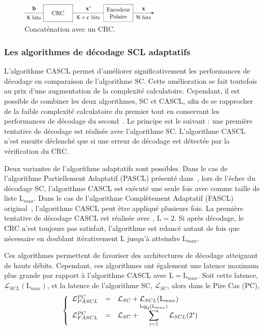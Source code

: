 \begin{figure}[t]
\centering
\includegraphics[width=0.6\textwidth]{main/ch1_fig/crc}
\caption{Concaténation avec un CRC.}
\label{fig:crc}
\end{figure}
\subsubsection{Les algorithmes de décodage SCL adaptatifs}
\label{subsubsec:adaptive}

L'algorithme CASCL permet d'améliorer significativement les performances de décodage en comparaison de l'algorithme SC.
Cette amélioration se fait toutefois au prix d'une augmentation de la complexité calculatoire.
Cependant, il est possible de combiner les deux algorithmes, SC et CASCL, afin de se rapprocher de la faible complexité calculatoire du premier tout en conservant les performances de décodage du second~\cite{li_adaptive_2012}.
Le principe est le suivant : une première tentative de décodage est réalisée avec l'algorithme SC. 
L'algorithme CASCL n'est ensuite déclenché que si une erreur de décodage est détectée par la vérification du CRC.

Deux variantes de l'algorithme adaptatifs sont possibles.
Dans le cas de l'algorithme Partiellement Adaptatif (PASCL) présenté dans~\cite{sarkis_fast_2016}, lors de l'échec du décodage SC, l'algorithme CASCL est exécuté une seule fois avec comme taille de liste $\mathrm{L}_{max}$.
Dans le cas de l'algorithme Complètement Adaptatif (FASCL) original~\cite{li_adaptive_2012}, l'algorithme CASCL peut être appliqué plusieurs fois.
La première tentative de décodage CASCL est réalisée avec , $\mathrm{L}=2$. Si après décodage, le CRC n'est toujours pas satisfait, l'algorithme est relancé autant de fois que nécessaire en doublant itérativement $\mathrm{L}$ jusqu'à atteindre $\mathrm{L}_{max}$.



Ces algorithmes permettent de favoriser des architectures de décodage atteignant de hauts débits. Cependant, ces algorithmes ont également une latence maximum plus grande par rapport à l'algorithme CASCL avec $\mathrm{L}=\mathrm{L}_{max}$. Soit cette latence, $\mathcal{L}_{SCL}(\mathrm{L}_{max})$, et la latence de l'algorithme SC, $\mathcal{L}_{SC}$, alors dans le Pire Cas (PC),
\begin{equation*}
\left\{\begin{array}{l c l}
\mathcal{L}^{PC}_{PASCL} & = &\mathcal{L}_{SC} + \mathcal{L}_{SCL}(\mathrm{L}_{max})\\
\mathcal{L}^{PC}_{FASCL} & = &\mathcal{L}_{SC} + \displaystyle\sum_{i=1}^{\log_2(\mathrm{L}_{max})}\mathcal{L}_{SCL}(2^i)
 \end{array}\right.
\end{equation*}
